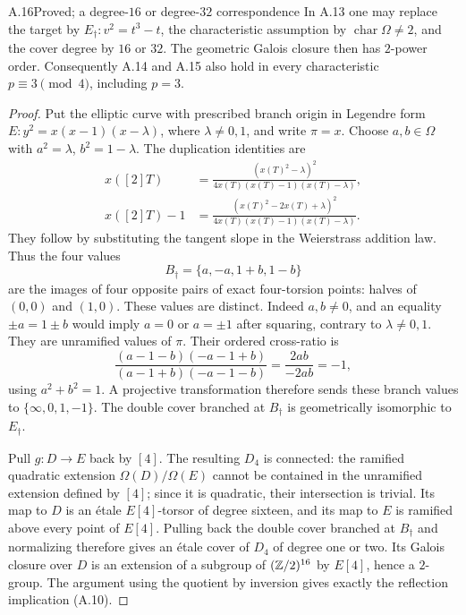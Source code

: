 \begin{claim}{A.16}{Proved; a degree-$16$ or degree-$32$ correspondence}
In A.13 one may replace the target by
$E_\dagger:v^2=t^3-t$, the characteristic assumption by
$\operatorname{char}\Omega\ne2$, and the cover degree by $16$ or
$32$. The geometric Galois closure then has $2$-power order.
Consequently A.14 and A.15 also hold in every characteristic
$p\equiv3\pmod4$, including $p=3$.
\end{claim}
\begin{proof}
Put the elliptic curve with prescribed branch origin in Legendre
form $E:y^2=x(x-1)(x-\lambda)$, where $\lambda\ne0,1$, and
write $\pi=x$. Choose $a,b\in\Omega$ with
$a^2=\lambda$, $b^2=1-\lambda$. The duplication identities are
\[
\begin{aligned}
 x([2]T)&=\frac{(x(T)^2-\lambda)^2}
                   {4x(T)(x(T)-1)(x(T)-\lambda)},\\
 x([2]T)-1&=\frac{(x(T)^2-2x(T)+\lambda)^2}
                   {4x(T)(x(T)-1)(x(T)-\lambda)}.
\end{aligned}
\]
They follow by substituting the tangent slope in the Weierstrass
addition law. Thus the four values
\[
 B_\dagger=\{a,-a,1+b,1-b\}
\]
are the images of four opposite pairs of exact four-torsion
points: halves of $(0,0)$ and $(1,0)$. These values are distinct.
Indeed $a,b\ne0$, and an equality $\pm a=1\pm b$ would imply
$a=0$ or $a=\pm1$ after squaring, contrary to $\lambda\ne0,1$.
They are unramified values of $\pi$. Their ordered cross-ratio is
\[
 \frac{(a-1-b)(-a-1+b)}{(a-1+b)(-a-1-b)}
       =\frac{2ab}{-2ab}=-1,
\]
using $a^2+b^2=1$. A projective transformation therefore sends
these branch values to $\{\infty,0,1,-1\}$. The double cover
branched at $B_\dagger$ is geometrically isomorphic to
$E_\dagger$.

Pull $g:D\to E$ back by $[4]$. The resulting $D_4$ is connected:
the ramified quadratic extension $\Omega(D)/\Omega(E)$ cannot
be contained in the unramified extension defined by $[4]$;
since it is quadratic, their intersection is trivial. Its map
to $D$ is an \'etale $E[4]$-torsor of degree sixteen, and its
map to $E$ is ramified above every point of $E[4]$.
Pulling back the double cover branched at $B_\dagger$ and
normalizing therefore gives an \'etale cover of $D_4$ of
degree one or two. Its Galois closure over $D$ is an extension
of a subgroup of $(\mathbb Z/2)^{16}$ by $E[4]$, hence a $2$-group.
The argument using the quotient by inversion gives exactly
the reflection implication (A.10).


\end{proof}
